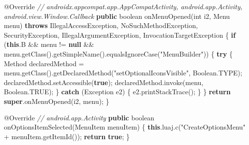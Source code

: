 \documentclass[
]{article}
\newenvironment{Shaded}{}{}
\newcommand{\AttributeTok}[1]{\textcolor[rgb]{0.49,0.56,0.16}{#1}}
\newcommand{\BuiltInTok}[1]{\textcolor[rgb]{0.00,0.50,0.00}{#1}}
\newcommand{\CommentTok}[1]{\textcolor[rgb]{0.38,0.63,0.69}{\textit{#1}}}
\newcommand{\ControlFlowTok}[1]{\textcolor[rgb]{0.00,0.44,0.13}{\textbf{#1}}}
\newcommand{\DataTypeTok}[1]{\textcolor[rgb]{0.56,0.13,0.00}{#1}}
\newcommand{\FunctionTok}[1]{\textcolor[rgb]{0.02,0.16,0.49}{#1}}
\newcommand{\KeywordTok}[1]{\textcolor[rgb]{0.00,0.44,0.13}{\textbf{#1}}}
\newcommand{\NormalTok}[1]{#1}
\newcommand{\OperatorTok}[1]{\textcolor[rgb]{0.40,0.40,0.40}{#1}}
\newcommand{\StringTok}[1]{\textcolor[rgb]{0.25,0.44,0.63}{#1}}
\begin{document}
\begin{Shaded}
\begin{Highlighting}[]
    \AttributeTok{@Override} \CommentTok{// androidx.appcompat.app.AppCompatActivity, android.app.Activity, android.view.Window.Callback}
    \KeywordTok{public} \DataTypeTok{boolean} \FunctionTok{onMenuOpened}\OperatorTok{(}\DataTypeTok{int}\NormalTok{ i2}\OperatorTok{,} \BuiltInTok{Menu}\NormalTok{ menu}\OperatorTok{)} \KeywordTok{throws} \BuiltInTok{IllegalAccessException}\OperatorTok{,} \BuiltInTok{NoSuchMethodException}\OperatorTok{,} \BuiltInTok{SecurityException}\OperatorTok{,} \BuiltInTok{IllegalArgumentException}\OperatorTok{,} \BuiltInTok{InvocationTargetException} \OperatorTok{\{}
        \ControlFlowTok{if} \OperatorTok{(}\KeywordTok{this}\OperatorTok{.}\FunctionTok{B} \OperatorTok{\&\&}\NormalTok{ menu }\OperatorTok{!=} \KeywordTok{null} \OperatorTok{\&\&}\NormalTok{ menu}\OperatorTok{.}\FunctionTok{getClass}\OperatorTok{().}\FunctionTok{getSimpleName}\OperatorTok{().}\FunctionTok{equalsIgnoreCase}\OperatorTok{(}\StringTok{"MenuBuilder"}\OperatorTok{))} \OperatorTok{\{}
            \ControlFlowTok{try} \OperatorTok{\{}
                \BuiltInTok{Method}\NormalTok{ declaredMethod }\OperatorTok{=}\NormalTok{ menu}\OperatorTok{.}\FunctionTok{getClass}\OperatorTok{().}\FunctionTok{getDeclaredMethod}\OperatorTok{(}\StringTok{"setOptionalIconsVisible"}\OperatorTok{,} \BuiltInTok{Boolean}\OperatorTok{.}\FunctionTok{TYPE}\OperatorTok{);}
\NormalTok{                declaredMethod}\OperatorTok{.}\FunctionTok{setAccessible}\OperatorTok{(}\KeywordTok{true}\OperatorTok{);}
\NormalTok{                declaredMethod}\OperatorTok{.}\FunctionTok{invoke}\OperatorTok{(}\NormalTok{menu}\OperatorTok{,} \BuiltInTok{Boolean}\OperatorTok{.}\FunctionTok{TRUE}\OperatorTok{);}
            \OperatorTok{\}} \ControlFlowTok{catch} \OperatorTok{(}\BuiltInTok{Exception}\NormalTok{ e2}\OperatorTok{)} \OperatorTok{\{}
\NormalTok{                e2}\OperatorTok{.}\FunctionTok{printStackTrace}\OperatorTok{();}
            \OperatorTok{\}}
        \OperatorTok{\}}
        \ControlFlowTok{return} \KeywordTok{super}\OperatorTok{.}\FunctionTok{onMenuOpened}\OperatorTok{(}\NormalTok{i2}\OperatorTok{,}\NormalTok{ menu}\OperatorTok{);}
    \OperatorTok{\}}

    \AttributeTok{@Override} \CommentTok{// android.app.Activity}
    \KeywordTok{public} \DataTypeTok{boolean} \FunctionTok{onOptionsItemSelected}\OperatorTok{(}\BuiltInTok{MenuItem}\NormalTok{ menuItem}\OperatorTok{)} \OperatorTok{\{}
        \KeywordTok{this}\OperatorTok{.}\FunctionTok{luaj}\OperatorTok{.}\FunctionTok{c}\OperatorTok{(}\StringTok{"CreateOptionsMenu"} \OperatorTok{+}\NormalTok{ menuItem}\OperatorTok{.}\FunctionTok{getItemId}\OperatorTok{());}
        \ControlFlowTok{return} \KeywordTok{true}\OperatorTok{;}
    \OperatorTok{\}}


\end{Highlighting}
\end{Shaded}
\end{document}
